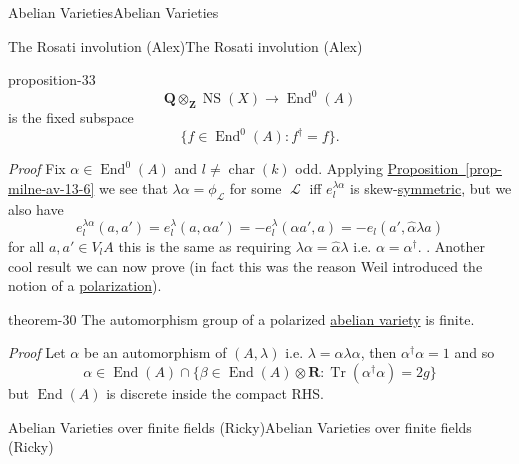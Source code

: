 \documentclass[10pt,]{book}
\makeatletter
\renewcommand*{\proofname}{Proof}
\renewenvironment{proof}[1][\proofname]{\par
  \pushQED{\qed}%
  \normalfont \topsep6\p@\@plus6\p@\relax
  \trivlist
  \item\relax
    {\itshape
    #1\@addpunct{.}}\hspace\labelsep\ignorespaces
}{%
  \popQED\endtrivlist\@endpefalse
}
\numberwithin{equation}{section}
\newcommand{\sheaf}[1]{\operatorname{\mathcal{#1}}}
\newcommand{\ZZ}{\mathbf{Z}}
\newcommand{\QQ}{\mathbf{Q}}
\newcommand{\RR}{\mathbf{R}}
\DeclareMathOperator{\End}{End}
\DeclareMathOperator{\characteristic}{char}
\DeclareMathOperator{\trace}{Tr}
\DeclareMathOperator{\NS}{NS}
\makeatother
\begin{document}
\begin{chapterptx}{Abelian Varieties}{}{Abelian Varieties}{}{}
\begin{sectionptx}{The Rosati involution (Alex)}{}{The Rosati involution (Alex)}{}{}
\begin{proposition}{}{}{proposition-33}
\begin{equation*}
\QQ \otimes_\ZZ \NS(X) \to \End^0(A)
\end{equation*}
is the fixed subspace%
\begin{equation*}
\{f \in \End^0(A) : f^\dagger = f\}\text{.}
\end{equation*}
%
\end{proposition}
\begin{proof}\hypertarget{proof-59}{}
\hypertarget{p-352}{}%
Fix \(\alpha \in \End^0(A)\) and \(l\ne \characteristic(k)\) odd. Applying \hyperref[prop-milne-av-13-6]{Proposition~\ref{prop-milne-av-13-6}} we see that \(\lambda \alpha = \phi_{\sheaf L}\) for some \(\sheaf L\) iff \(e^{\lambda\alpha}_l\) is skew-\hyperref[def-princ-pol]{symmetric}, but we also have%
\begin{equation*}
e_l^{\lambda\alpha}(a,a')=  e_l^{\lambda}(a,\alpha a') = -e_l^\lambda(\alpha a',a) = -e_l(a', \hat\alpha \lambda a)
\end{equation*}
for all \(a,a' \in V_lA\) this is the same as requiring \(\lambda\alpha = \hat \alpha \lambda\) i.e. \(\alpha = \alpha^\dagger\). .%
\end{proof}
\hypertarget{p-353}{}%
Another cool result we can now prove (in fact this was the reason Weil introduced the notion of a \hyperref[def-polarization]{polarization}).%
\begin{theorem}{}{}{theorem-30}%
\hypertarget{p-354}{}%
The automorphism group of a polarized \hyperref[def-buntes-abvar]{abelian variety} is finite.%
\end{theorem}
\begin{proof}\hypertarget{proof-60}{}
\hypertarget{p-355}{}%
Let \(\alpha\) be an automorphism of \((A, \lambda)\) i.e. \(\lambda =\hat \alpha  \lambda \alpha\), then \(\alpha^\dagger \alpha= 1\) and so%
\begin{equation*}
\alpha \in \End(A)\cap \{\beta \in \End(A) \otimes \RR: \trace(\alpha^\dagger \alpha) = 2g\}
\end{equation*}
but \(\End(A)\) is discrete inside the compact RHS.%
\end{proof}
\end{sectionptx}
%
%
\typeout{************************************************}
\typeout{************************************************}
%
\begin{sectionptx}{Abelian Varieties over finite fields (Ricky)}{}{Abelian Varieties over finite fields (Ricky)}{}{}\label{sec-avs-over-ffs}

\end{sectionptx}
\end{chapterptx}
\end{document}
